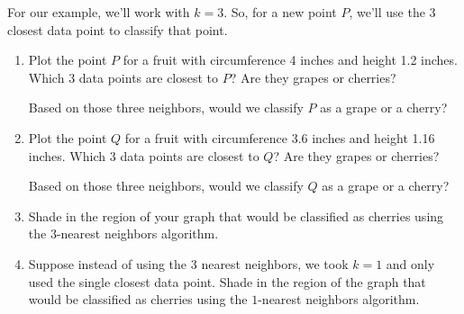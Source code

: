 \documentclass[10pt]{article}
\begin{document}
For our example, we'll work with $k=3$. So, for a new point $P$, we'll use the $3$ closest data point to classify that point.

\begin{enumerate}

\item Plot the point $P$ for a fruit with circumference 4 inches and height 1.2 inches. Which $3$ data points are closest to $P$? Are they grapes or cherries?
\vspace{1.5cm}

Based on those three neighbors, would we classify $P$ as a grape or a cherry?
\vspace{1cm}

\item Plot the point $Q$ for a fruit with circumference 3.6 inches and height 1.16 inches. Which $3$ data points are closest to $Q$? Are they grapes or cherries?
\vspace{1.5cm}

Based on those three neighbors, would we classify $Q$ as a grape or a cherry?
\vspace{1cm}

\vfill
\item Shade in the region of your graph that would be classified as cherries using the $3$-nearest neighbors algorithm.

\newpage

\item Suppose instead of using the $3$ nearest neighbors, we took $k=1$ and only used the single closest data point. Shade in the region of the graph that would be classified as cherries using the $1$-nearest neighbors algorithm.

\begin{center}
\end{center}
\end{enumerate}
\end{document}
